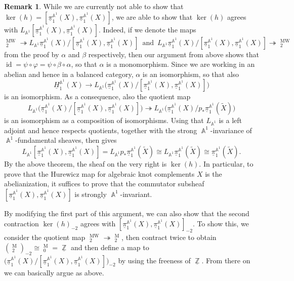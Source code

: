 \documentclass[english]{amsart}
\theoremstyle{definition}
\newtheorem{rem}[prop]{Remark}
\DeclareMathOperator{\Z}{\mathbb{Z}}
\DeclareMathOperator{\A}{\mathbb{A}}
\DeclareMathOperator{\id}{id}
\renewcommand{\ker}{\kerr}
\DeclareMathOperator{\kerr}{ker}
\DeclareMathOperator{\KK}{\underline{K}}
\DeclareMathOperator{\MM}{M}
\DeclareMathOperator{\MW}{MW}
\begin{document}
\begin{rem}
While we are currently not able to show that $\ker(h) = [\underline{\pi}_1^{\A^1}\!(X),\underline{\pi}_1^{\A^1}\!(X)]$,  we are able to show that $\ker(h)$ agrees with $L_{\A^1}[\underline{\pi}_1^{\A^1}\!(X),\underline{\pi}_1^{\A^1}\!(X)]$. Indeed, if we denote the maps 
$$\KK^{\MW}_2 \twoheadrightarrow L_{\A^1}\underline{\pi}_1^{\A^1}\!(X)/[\underline{\pi}_1^{\A^1}\!(X),\underline{\pi}_1^{\A^1}\!(X)] \,\,\, \text{and} \,\,\, L_{\A^1}\underline{\pi}_1^{\A^1}\!(X)/[\underline{\pi}_1^{\A^1}\!(X),\underline{\pi}_1^{\A^1}\!(X)] \twoheadrightarrow \KK^{\MW}_2$$
from the proof by $\alpha$ and $\beta$ respectively, then our argument from above shows that $\id = \psi \circ \varphi = \psi \circ \beta \circ \alpha$, so that $\alpha$ is a monomorphism. Since we are working in an abelian and hence in a balanced category, $\alpha$ is an isomorphism, so that also 
$$\underline{H}_1^{\A^1}\!(X) \to L_{\A^1}\bigl(\underline{\pi}_1^{\A^1}\!(X)/[\underline{\pi}_1^{\A^1}\!(X),\underline{\pi}_1^{\A^1}\!(X)]\bigr)$$
is an isomorphism. As a consequence, also the quotient map
$$L_{\A^1}\bigl(\underline{\pi}_1^{\A^1}\!(X)/[\underline{\pi}_1^{\A^1}\!(X),\underline{\pi}_1^{\A^1}\!(X)]\bigr) \twoheadrightarrow L_{\A^1}\bigl(\underline{\pi}_1^{\A^1}\!(X)/p_*\underline{\pi}_1^{\A^1}\!(\widetilde{X})\bigr)$$
is an isomorphism as a composition of isomorphisms. Using that $L_{\A^1}$ is a left adjoint and hence respects quotients, together with the strong $\A^1$-invariance of $\A^1$-fundamental sheaves, then gives 
$$L_{\A^1}[\underline{\pi}_1^{\A^1}\!(X),\underline{\pi}_1^{\A^1}\!(X)] = L_{\A^1}p_*\underline{\pi}_1^{\A^1}\!(\widetilde{X}) \cong L_{\A^1}\underline{\pi}_1^{\A^1}\!(\widetilde{X}) \cong \underline{\pi}_1^{\A^1}\!(\widetilde{X}).$$
By the above theorem, the sheaf on the very right is $\ker(h)$. In particular, to prove that the Hurewicz map for algebraic knot complements $X$ is the abelianization, it suffices to prove that the commutator subsheaf $[\underline{\pi}_1^{\A^1}\!(X),\underline{\pi}_1^{\A^1}\!(X)]$ is strongly $\A^1$-invariant.

By modifying the first part of this argument, we can also show that the second contraction $\ker(h)_{-2}$ agrees with $[\underline{\pi}_1^{\A^1}\!(X),\underline{\pi}_1^{\A^1}\!(X)]_{-2}$. To show this, we consider the quotient map $\KK^{\MW}_2 \twoheadrightarrow \KK^{\MM}_2$, then contract twice to obtain $(\KK^{\MM}_2)_{-2} \cong \KK^{\MM}_0 = \underline{\Z}$ and then define a map to $\bigl(\underline{\pi}_1^{\A^1}\!(X)/[\underline{\pi}_1^{\A^1}\!(X),\underline{\pi}_1^{\A^1}\!(X)]\bigr)_{-2}$ by using the freeness of $\underline{\Z}$. From there on we can basically argue as above.
\end{rem}
\end{document}
